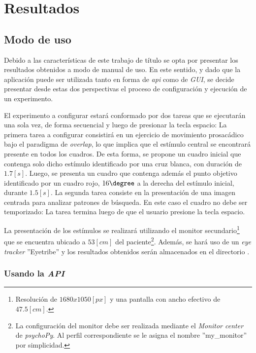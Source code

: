 \documentclass[\main/Main.tex]{subfiles}
\begin{document}
\chapter{Resultados}
\label{cha:04_resultados}
    \section{Modo de uso}
    \label{sec:04_modo_uso}
        Debido a las características de este trabajo de título se opta por presentar los resultados obtenidos a modo de manual de uso. En este sentido, y dado que la aplicación puede ser utilizada tanto en forma de \textit{\acrshort{api}} como de \textit{GUI}, se decide presentar desde estas dos perspectivas el proceso de configuración y ejecución de un experimento.

        El experimento a configurar estará conformado por dos tareas que se ejecutarán una sola vez, de forma secuencial y luego de presionar la tecla espacio: La primera tarea a configurar consistirá en un ejercicio de movimiento prosacádico bajo el paradigma de \textit{overlap}, lo que implica que el estímulo central se encontrará presente en todos los cuadros. De esta forma, se propone un cuadro inicial que contenga solo dicho estímulo identificado por una cruz blanca, con duración de $1.7[s]$. Luego, se presenta un cuadro que contenga además el punto objetivo identificado por un cuadro rojo, $16\degree$ a la derecha del estímulo inicial, durante $1.5[s]$. La segunda tarea consiste en la presentación de una imagen centrada para analizar patrones de búsqueda. En este caso el cuadro no debe ser temporizado: La tarea termina luego de que el usuario presione la tecla espacio. 

        La presentación de los estímulos se realizará utilizando el monitor secundario\footnote{Resolución de $1680x1050[px]$ y una pantalla con ancho efectivo de $47.5[cm]$.} que se encuentra ubicado a $53[cm]$ del paciente\footnote{La configuración del monitor debe ser realizada mediante el \textit{Monitor center} de \textit{psychoPy}. Al perfil correspondiente se le asigna el nombre ''my\_monitor'' por simplicidad.}. Además, se hará uso de un \textit{eye tracker} ''Eyetribe'' y los resultados obtenidos serán almacenados en el directorio .

        \newpage
        \subsection{Usando la \textit{API}}
\end{document}
